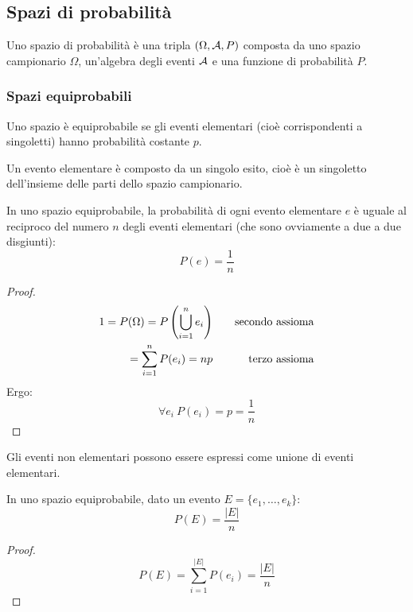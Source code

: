 \subsection{Spazi di probabilità}
\begin{defin}
	Uno spazio di probabilità è una tripla $(\Omega,\mathcal A,P)$ composta da uno spazio campionario $\Omega$, un'algebra degli eventi $\mathcal A$ e una funzione di probabilità $P$.
\end{defin}


\subsubsection{Spazi equiprobabili}
\begin{defin}
	Uno spazio è equiprobabile se gli eventi elementari (cioè corrispondenti a singoletti) hanno probabilità costante $p$.
\end{defin}

Un evento elementare è composto da un singolo esito, cioè è un singoletto dell'insieme delle parti dello spazio campionario.
\begin{teor}
	In uno spazio equiprobabile, la probabilità di ogni evento elementare $e$ è uguale al reciproco del numero $n$ degli eventi elementari (che sono ovviamente a due a due disgiunti):
	\begin{equation}
		P(e)=\frac{1}{n}
	\end{equation}
\end{teor}
\begin{proof}
	\begin{align*}
		1=P(\Omega)=P\left( \bigcup_{i=1}^n e_i \right) & \quad & \text{secondo assioma} \\
		=\sum_{i=1}^n P(e_i) = np & \quad & \text{terzo assioma}                         \\
	\end{align*}
	Ergo:
	\begin{equation*}
		\forall e_i ~ P(e_i)=p=\frac{1}{n}
	\end{equation*}
\end{proof}

Gli eventi non elementari possono essere espressi come unione di eventi elementari.
\begin{teor}
	In uno spazio equiprobabile, dato un evento $E=\{e_1,\dots,e_k\}$:
	\begin{equation}
		P(E)=\frac{|E|}{n}
	\end{equation}
\end{teor}
\begin{proof}
	\begin{equation*}
		P(E)= \sum_{i=1}^{|E|} P(e_i) = \frac{|E|}{n}
	\end{equation*}
\end{proof}
